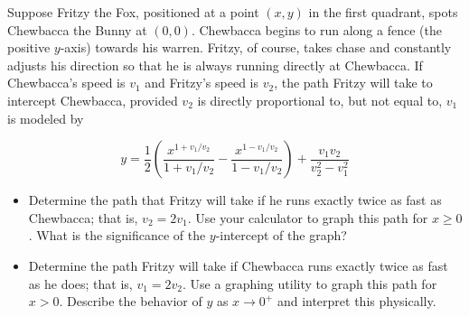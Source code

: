 \documentclass{ximera}
\begin{document}
\begin{problem}
Suppose Fritzy the Fox, positioned at a point $(x,y)$ in the first quadrant, spots Chewbacca the Bunny at $(0,0)$.   Chewbacca begins to run along a fence (the positive $y$-axis) towards his warren.  Fritzy, of course, takes chase and constantly adjusts his direction so that he is always running directly at Chewbacca.  If Chewbacca's speed is $v_1$ and  Fritzy's speed is $v_2$, the path Fritzy will take to intercept Chewbacca, provided $v_2$ is directly proportional to, but not equal to, $v_1$ is modeled by

\[ y = \frac{1}{2} \left(\frac{x^{1+ v_{1}/v_{2}}}{1+v_1/v_2}- \frac{x^{1-v_1/v_2}}{1-v_1/v_2}\right) + \frac{v_1 v_2}{v_2^2-v_1^2} \]


\begin{itemize}
\item 
Determine the path that Fritzy will take if he runs exactly twice as fast as Chewbacca;  that is, $v_2 = 2v_1$. Use your calculator to graph this path for $x \geq 0$.  What is the significance of the $y$-intercept of the graph?

\begin{solution}

\end{solution}

\item 
Determine the path Fritzy will take if Chewbacca runs exactly twice as fast as he does;  that is, $v_1 = 2v_2$.  Use a graphing utility to graph this path for $x > 0$.  Describe the behavior of $y$ as $x \rightarrow 0^{+}$ and interpret this physically.

\end{itemize}
\end{problem}
\end{document}
